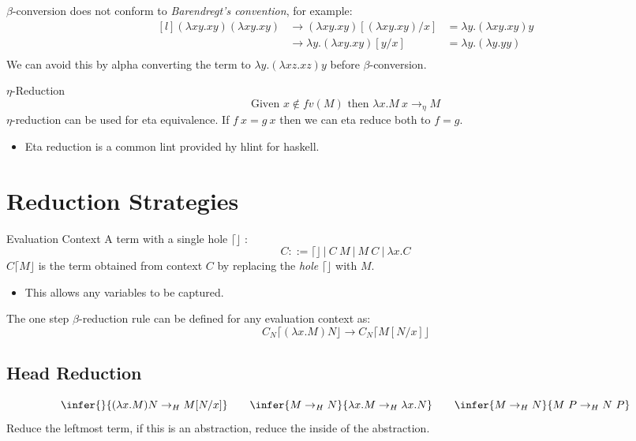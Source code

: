 $\beta$-conversion does not conform to \textit{Barendregt's convention}, for example:
\[\begin{matrix*}[l]
		(\lambda xy.x y) (\lambda xy.x y) & \to (\lambda xy.x y)[(\lambda xy.x y)/x] & = \lambda y . (\lambda xy.x y) y \\
		& \to \lambda y.(\lambda xy.x y)[y/x] & = \lambda y.(\lambda y. y y) \\
	\end{matrix*}\]
We can avoid this by alpha converting the term to $\lambda y . (\lambda x z. x z) y$ before $\beta$-conversion.

\begin{definitionbox}{$\eta$-Reduction}
	\[\text{Given } x \not\in fv(M) \text{ then } \lambda x. M \ x \to_\eta M\]
	$\eta$-reduction can be used for eta equivalence. If $f \ x = g \ x$ then we can eta reduce both to $f = g$.
	\begin{itemize}
		\item Eta reduction is a common lint provided hy hlint for haskell.
	\end{itemize}
\end{definitionbox}

\section{Reduction Strategies}
\begin{definitionbox}{Evaluation Context}
	A term with a single hole $\lceil \rfloor$ :
	\[C ::= \lceil \rfloor \ | \ C \ M \ | \ M \ C \ | \ \lambda x. C\]
	$C\lceil M \rfloor$ is the term obtained from context $C$ by replacing the \textit{hole} $\lceil \rfloor$ with $M$.
	\begin{itemize}
		\item This allows any variables to be captured.
	\end{itemize}
	The one step $\beta$-reduction rule can be defined for any evaluation context as:
	\[C_N\lceil (\lambda x.M) N \rfloor \to C_N \lceil M[N/x] \rfloor\]
\end{definitionbox}

\subsection{Head Reduction}
\[\infer{}{(\lambda x. M) N \to_H M[N/x]} \qquad \infer{M \to_H N}{\lambda x. M \to_H \lambda x. N} \qquad \infer{M \to_H N}{M \ P \to_H N \ P}\]
Reduce the leftmost term, if this is an abstraction, reduce the inside of the abstraction.


